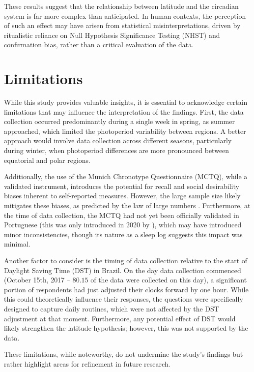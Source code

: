 \documentclass[
12pt,
openright,
oneside,
a4paper,
chapter=TITLE,
section=TITLE,
french,
spanish,
brazil,
english
]{abntex2}\usepackage{array}
\begin{document}
These results suggest that the relationship between latitude and the
circadian system is far more complex than anticipated. In human
contexts, the perception of such an effect may have arisen from
statistical misinterpretations, driven by ritualistic reliance on Null
Hypothesis Significance Testing (NHST) and confirmation bias, rather
than a critical evaluation of the data.

\section{Limitations}\label{limitations}

While this study provides valuable insights, it is essential to
acknowledge certain limitations that may influence the interpretation of
the findings. First, the data collection occurred predominantly during a
single week in spring, as summer approached, which limited the
photoperiod variability between regions. A better approach would involve
data collection across different seasons, particularly during winter,
when photoperiod differences are more pronounced between equatorial and
polar regions.

Additionally, the use of the Munich Chronotype Questionnaire (MCTQ),
while a validated instrument, introduces the potential for recall and
social desirability biases inherent to self-reported measures. However,
the large sample size likely mitigates these biases, as predicted by the
law of large numbers \autocite[352]{degroot2012}. Furthermore, at the
time of data collection, the MCTQ had not yet been officially validated
in Portuguese (this was only introduced in 2020 by
\textcite{reis2020a}), which may have introduced minor inconsistencies,
though its nature as a sleep log suggests this impact was minimal.

Another factor to consider is the timing of data collection relative to
the start of Daylight Saving Time (DST) in Brazil. On the day data
collection commenced (October 15th, 2017 -- \(80.15%
\) of the data were collected on this day), a significant portion of
respondents had just adjusted their clocks forward by one hour. While
this could theoretically influence their responses, the questions were
specifically designed to capture daily routines, which were not affected
by the DST adjustment at that moment. Furthermore, any potential effect
of DST would likely strengthen the latitude hypothesis; however, this
was not supported by the data.

These limitations, while noteworthy, do not undermine the study's
findings but rather highlight areas for refinement in future research.
\end{document}
